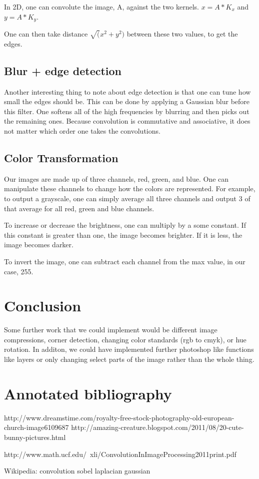\documentclass[11pt]{article}
\begin{document}
In 2D, one can convolute the image, A, against the two kernels. $x = A*K_x$ and $y=A*K_y$. 

One can then take distance $\sqrt(x^2+y^2)$ between these two values, to get the edges. 


\subsection{Blur + edge detection}
Another interesting thing to note about edge detection is that one can tune how small the edges should be. This can be done by applying a Gaussian blur before this filter. One softens all of the high frequencies by blurring and then picks out the remaining ones. 
Because convolution is commutative and associative, it does not matter which order one takes the convolutions.

\subsection{Color Transformation}
Our images are made up of three channels, red, green, and blue. One can manipulate these channels to change how the colors are represented. For example, to output a grayscale, one can simply average all three channels and output 3 of that average for all red, green and blue channels.

To increase or decrease the brightness, one can multiply by a some constant. If this constant is greater than one, the image becomes brighter. If it is less, the image becomes darker. 

To invert the image, one can subtract each channel from the max value, in our case, 255.





\section{Conclusion}
Some further work that we could implement would be different image compressions, corner detection, changing color standards (rgb to cmyk), or hue rotation. In additon, we could have implemented further photoshop like
functions like layers or only changing select parts of the image rather than the whole thing.

\section{Annotated bibliography}
http://www.dreamstime.com/royalty-free-stock-photography-old-european-church-image6109687
http://amazing-creature.blogspot.com/2011/08/20-cute-bunny-pictures.html

http://www.math.ucf.edu/~xli/ConvolutionInImageProcessing2011print.pdf


Wikipedia:
convolution
sobel
laplacian
gaussian
\end{document}
